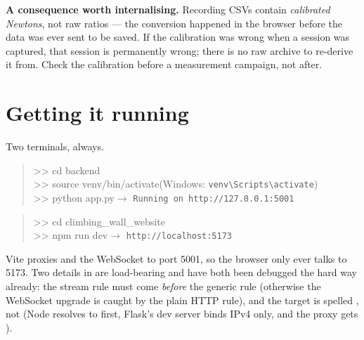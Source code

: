 \documentclass[11pt,a4paper]{article}
\begin{document}
\begin{infobox}
\textbf{A consequence worth internalising.} Recording CSVs contain
\emph{calibrated Newtons}, not raw ratios --- the conversion happened in the
browser before the data was ever sent to be saved. If the calibration was wrong
when a session was captured, that session is permanently wrong; there is no raw
archive to re-derive it from. Check the calibration before a measurement
campaign, not after.
\end{infobox}


\section{Getting it running}

Two terminals, always.

\begin{quote}\ttfamily\small
>> cd backend\\
>> source venv/bin/activate\hfill\textrm{\footnotesize(Windows: \texttt{venv\textbackslash Scripts\textbackslash activate})}\\
>> python app.py\hfill\textrm{\footnotesize$\rightarrow$ \texttt{Running on http://127.0.0.1:5001}}
\end{quote}

\begin{quote}\ttfamily\small
>> cd climbing\_wall\_website\\
>> npm run dev\hfill\textrm{\footnotesize$\rightarrow$ \texttt{http://localhost:5173}}
\end{quote}

Vite proxies  and the  WebSocket to port 5001, so
the browser only ever talks to 5173. Two details in  are
load-bearing and have both been debugged the hard way already: the stream rule
must come \emph{before} the generic  rule (otherwise the WebSocket
upgrade is caught by the plain HTTP rule), and the target is spelled
, not  (Node resolves  to
 first, Flask's dev server binds IPv4 only, and the proxy gets
).
\end{document}
